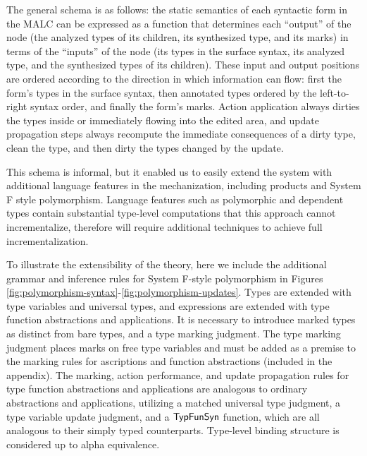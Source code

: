 The general schema is as follows: the static semantics of each syntactic form in the MALC can be expressed as a function that determines each ``output'' of the node (the analyzed types of its children, its synthesized type, and its marks) in terms of the ``inputs'' of the node (its types in the surface syntax, its analyzed type, and the synthesized types of its children). These input and output positions are ordered according to the direction in which information can flow: first the form's types in the surface syntax, then annotated types ordered by the left-to-right syntax order, and finally the form's marks. Action application always dirties the types inside or immediately flowing into the edited area, and update propagation steps always recompute the immediate consequences of a dirty type, clean the type, and then dirty the types changed by the update. 

This schema is informal, but it enabled us to easily extend the system with additional language features in the mechanization, including products and System F style polymorphism. Language features such as polymorphic and dependent types contain substantial type-level computations that this approach cannot incrementalize, therefore will require additional techniques to achieve full incrementalization.

To illustrate the extensibility of the theory, here we include the additional grammar and inference rules for System F-style polymorphism in Figures \ref{fig:polymorphism-syntax}-\ref{fig:polymorphism-updates}. Types are extended with type variables and universal types, and expressions are extended with type function abstractions and applications. It is necessary to introduce marked types as distinct from bare types, and a type marking judgment. The type marking judgment places marks on free type variables and must be added as a premise to the marking rules for ascriptions and function abstractions (included in the appendix). The marking, action performance, and update propagation rules for type function abstractions and applications are analogous to ordinary abstractions and applications, utilizing a matched universal type judgment, a type variable update judgment, and a $\mathsf{TypFunSyn}$ function, which are all analogous to their simply typed counterparts. Type-level binding structure is considered up to alpha equivalence.  


